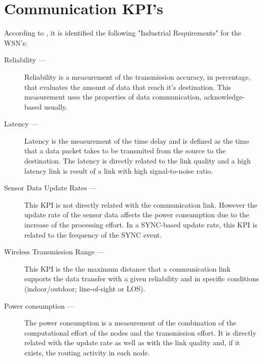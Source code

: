 \section{Communication KPI’s}

According to \cite{Radmand2010}, it is identified the following "Industrial Requirements" for the WSN's:

\begin{description}
	\item[Reliability ---] Reliability is a measurement of the transmission accuracy, in percentage, that evaluates the amount of data that reach it's destination. This measurement uses the properties of data communication, acknowledge-based usually.
	
	\item[Latency ---] Latency is the measurement of the time delay and is defined as the time that a data packet takes to be transmited from the source to the destination. The latency is directly related to the link quality and a high latency link is result of a link with high signal-to-noise ratio. 
	
	\item[Sensor Data Update Rates ---] This KPI is not directly related with the communication link. However the update rate of the sensor data affects the power consumption due to the increase of the processing effort. In a SYNC-based update rate, this KPI is related to the frequency of the SYNC event.
	
	\item[Wireless Transmission Range ---] This KPI is the the maximum distance that a communication link supports the data transfer with a given reliability and in specific conditions (indoor/outdoor; line-of-sight or LOS).
	
	\item[Power consumption ---] The power consumption is a measurement of the combination of the computational effort of the nodes and the transmission effort. It is directly related with the update rate as well as with the link quality and, if it exists, the routing activity in each node.

\end{description}







